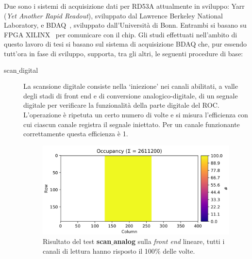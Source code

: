 Due sono i sistemi di acquisizione dati per RD53A attualmente in sviluppo: Yarr~\cite{YARR} (\textit{Yet Another Rapid Readout}), sviluppato dal Lawrence Berkeley National Laboratory, e BDAQ~\cite{BDAQ}, sviluppato dall'Università di Bonn. Entrambi si basano su FPGA XILINX~\cite{xilinx} per comunicare con il chip. 
Gli studi effettuati nell'ambito di questo lavoro di tesi si basano sul sistema di acquisizione BDAQ che, pur essendo tutt'ora in fase di sviluppo, supporta, tra gli altri, le seguenti procedure di base:
\begin{description}

\item[scan$\_$digital] La scansione digitale consiste nella `iniezione' nei canali abilitati, a valle degli stadi di front end e di conversione analogico-digitale, di un segnale digitale per verificare la funzionalità della parte digitale del ROC. L'operazione \`e ripetuta un certo numero di volte e si misura l'efficienza con cui ciascun canale registra il segnale iniettato. Per un canale funzionante correttamente questa efficienza \`e 1.%

\begin{figure}
\centering
\includegraphics[width=\textwidth]{Immagini/ScanAnalogLinear}
\caption{Risultato del test \textbf{scan$\_$analog} sulla \textit{front end} lineare, tutti i canali di lettura hanno risposto il 100$\%$ delle volte.}
\label{ScanAnalogLinear}
\end{figure}


\end{description}
